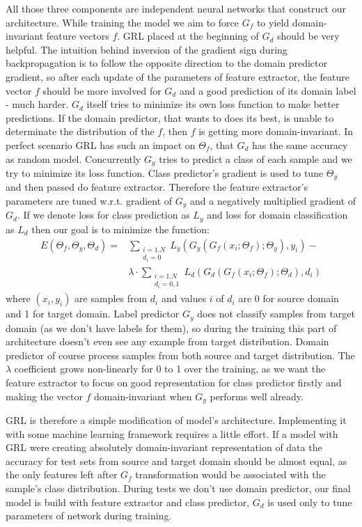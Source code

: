 \documentclass{article}
\begin{document}
All those three components are independent neural networks that construct our architecture. While training the model we aim to force $G_{f}$ to yield domain-invariant feature vectors $f$. GRL placed at the beginning of $G_{d}$ should be very helpful. The intuition behind inversion of the gradient sign during backpropagation is to follow the opposite direction to the domain predictor gradient, so after each update of the parameters of feature extractor, the feature vector $f$ should be more involved for $G_{d}$ and a good prediction of its domain label - much harder. $G_{d}$ itself tries to minimize its own loss function to make better predictions. If the domain predictor, that wants to does its best, is unable to determinate the distribution of the $f$, then $f$ is getting more domain-invariant. In perfect scenario GRL has such an impact on $\Theta_{f}$, that $G_{d}$ has the same accuracy as random model. Concurrently $G_{y}$ tries to predict a class of each sample and we try to minimize its loss function. Class predictor's gradient is used to tune $\Theta_{y}$ and then passed do feature extractor. Therefore the feature extractor's parameters are tuned w.r.t. gradient of $G_{y}$ and a negatively multiplied gradient of $G_{d}$. If we denote loss for class prediction as $L_{y}$ and loss for domain classification as $L_{d}$ then our goal is to minimize the function:
\begin{align*} 
E(\Theta_{f}, \Theta_{y}, \Theta_{d}) = &\sum_{\substack{i=1.N \\ d_{i}=0}} L_{y}(G_{y} (G_{f}(x_{i};\Theta_{f}); \Theta_{y} ), y_{i} ) - \\
 &\lambda \cdot \sum_{\substack{i=1.N \\ d_{i}=0,1}} L_{d}(G_{d} (G_{f}(x_{i};\Theta_{f}); \Theta_{d} ), d_{i} )
\end{align*}
where $(x_{i}, y_{i})$ are samples from $d_{i}$ and values $i$ of $d_{i}$ are 0 for source domain and 1 for target domain. Label predictor $G_{y}$ does not classify samples from target domain (as we don't have labels for them), so during the training this part of architecture doesn't even see any example from target distribution. Domain predictor of course process samples from both source and target distribution. The $\lambda$ coefficient grows non-linearly for 0 to 1 over the training, as we want the feature extractor to focus on good representation for class predictor firstly and making the vector $f$ domain-invariant when $G_{y}$ performs well already. 
\par
GRL is therefore a simple modification of model's architecture. Implementing it with some machine learning framework requires a little effort. If a model with GRL were creating absolutely domain-invariant representation of data the accuracy for test sets from source and target domain should be almost equal, as the only features left after $G_{f}$ transformation would be associated with the sample's class distribution. During tests we don't use domain predictor, our final model is build with feature extractor and class predictor, $G_{d}$ is used only to tune parameters of network during training.
\end{document}
